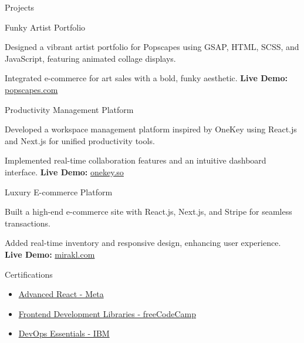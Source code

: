 \documentclass{resume}
\begin{document}
\begin{rSection}{Projects}
\begin{rSubsection}{Funky Artist Portfolio}{}{}{}
\item Designed a vibrant artist portfolio for Popscapes using GSAP, HTML, SCSS, and JavaScript, featuring animated collage displays.
\item Integrated e-commerce for art sales with a bold, funky aesthetic. \textbf{Live Demo:} \href{https://popscapes.com}{popscapes.com}
\end{rSubsection}

\begin{rSubsection}{Productivity Management Platform}{}{}{}
\item Developed a workspace management platform inspired by OneKey using React.js and Next.js for unified productivity tools.
\item Implemented real-time collaboration features and an intuitive dashboard interface. \textbf{Live Demo:} \href{https://onekey.so}{onekey.so}
\end{rSubsection}

\begin{rSubsection}{Luxury E-commerce Platform}{}{}{}
\item Built a high-end e-commerce site with React.js, Next.js, and Stripe for seamless transactions.
\item Added real-time inventory and responsive design, enhancing user experience. \textbf{Live Demo:} \href{https://www.mirakl.com}{mirakl.com}
\end{rSubsection}

\end{rSection}


\begin{rSection}{Certifications}
\begin{itemize}[leftmargin=*]
\item \href{https://www.coursera.org/account/accomplishments/verify/QC73X86DWCRK}{Advanced React - Meta}
\item \href{https://www.freecodecamp.org/certification/fcc36860a3c-366f-4e05-8655-9eeeba048998/front-end-development-libraries}{Frontend Development Libraries - freeCodeCamp}
\item \href{https://www.credly.com/badges/41de71d0-506d-4fc4-98b8-3d72b7d4fd44/linked_in_profile}{DevOps Essentials - IBM}
\end{itemize}
\end{rSection}
\end{document}
